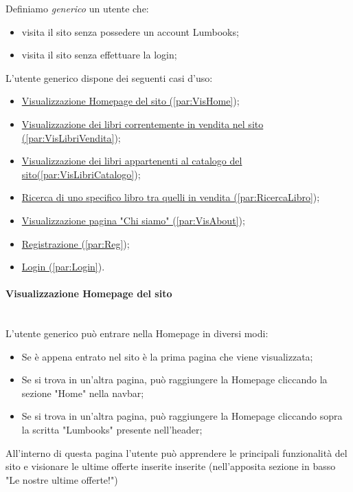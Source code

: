 Definiamo \textit{generico} un utente che:
\begin{itemize}
	\item visita il sito senza possedere un account Lumbooks;
	\item visita il sito senza effettuare la login;
\end{itemize}

L'utente generico dispone dei seguenti casi d'uso:
\begin{itemize}
	\item \hyperref[par:VisHome]{Visualizzazione Homepage del sito (\ref{par:VisHome}});
	\item \hyperref[par:VisLibriVendita]{Visualizzazione dei libri correntemente in vendita nel sito (\ref{par:VisLibriVendita}});
	\item \hyperref[par:VisLibriCatalogo]{Visualizzazione dei libri appartenenti al catalogo del sito(\ref{par:VisLibriCatalogo}});
	\item \hyperref[par:RicercaLibro]{Ricerca di uno specifico libro tra quelli in vendita (\ref{par:RicercaLibro}});
	\item \hyperref[par:VisAbout]{Visualizzazione pagina "Chi siamo" (\ref{par:VisAbout}});	
	\item \hyperref[par:Reg]{Registrazione (\ref{par:Reg}});
	\item \hyperref[par:Login]{Login (\ref{par:Login}}).
\end{itemize}


\paragraph{Visualizzazione Homepage del sito}\mbox{}\\
\label{par:VisHome}
L'utente generico può entrare nella Homepage in diversi modi:
\begin{itemize}
	\item Se è appena entrato nel sito è la prima pagina che viene visualizzata;
	\item Se si trova in un'altra pagina, può raggiungere la Homepage cliccando la sezione "Home" nella navbar;
	\item Se si trova in un'altra pagina, può raggiungere la Homepage cliccando sopra la scritta "Lumbooks" presente nell'header;
\end{itemize}
All'interno di questa pagina l'utente può apprendere le principali funzionalità del sito e visionare le ultime offerte inserite inserite (nell'apposita sezione in basso "Le nostre ultime offerte!")



